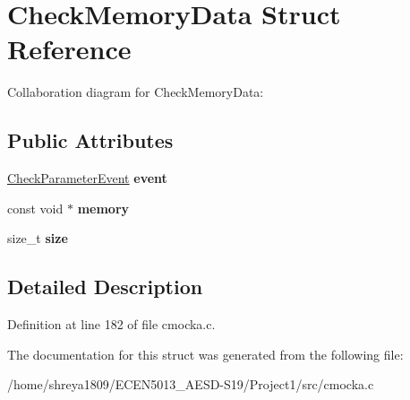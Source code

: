 \hypertarget{structCheckMemoryData}{}\section{Check\+Memory\+Data Struct Reference}
\label{structCheckMemoryData}


Collaboration diagram for Check\+Memory\+Data\+:
\subsection*{Public Attributes}
\begin{DoxyCompactItemize}
\item 
\mbox{\label{structCheckMemoryData_afa102f599993f28924b9f73cf9b45990}} 
\hyperlink{structCheckParameterEvent}{Check\+Parameter\+Event} {\bfseries event}
\item 
\mbox{\label{structCheckMemoryData_aac7288cc682bfa7917c6258c56aeb723}} 
const void $\ast$ {\bfseries memory}
\item 
\mbox{\label{structCheckMemoryData_a0015b301a15e7b148e95aa1d6f51cb11}} 
size\+\_\+t {\bfseries size}
\end{DoxyCompactItemize}


\subsection{Detailed Description}


Definition at line 182 of file cmocka.\+c.



The documentation for this struct was generated from the following file\+:\begin{DoxyCompactItemize}
\item 
/home/shreya1809/\+E\+C\+E\+N5013\+\_\+\+A\+E\+S\+D-\/\+S19/\+Project1/src/cmocka.\+c\end{DoxyCompactItemize}

